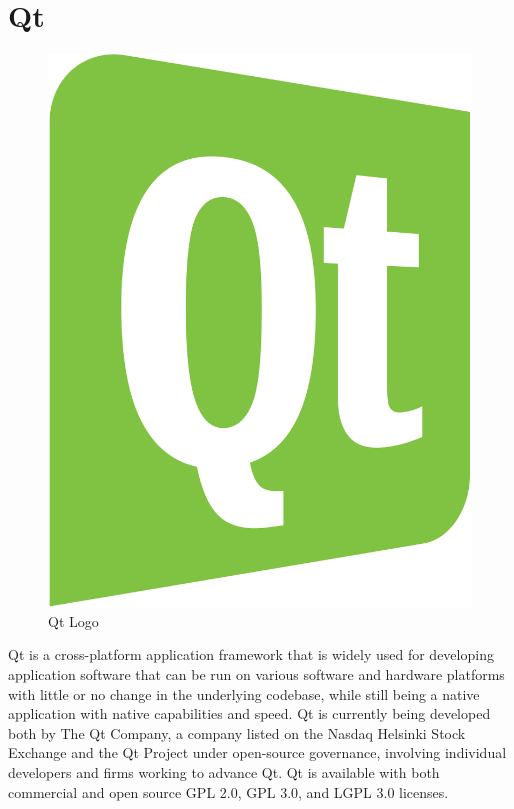 \section{Qt}

\begin{figure}[h]
	\centering \includegraphics[scale=0.1]{images/qt.png}
	\caption{Qt Logo}
\end{figure}

Qt is a cross-platform application framework that is widely used for developing application software that can be run on various software and hardware platforms with little or no change in the underlying codebase, while still being a native application with native capabilities and speed. Qt is currently being developed both by The Qt Company, a company listed on the Nasdaq Helsinki Stock Exchange and the Qt Project under open-source governance, involving individual developers and firms working to advance Qt. Qt is available with both commercial and open source GPL 2.0, GPL 3.0, and LGPL 3.0 licenses.

